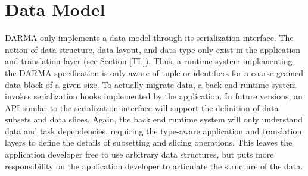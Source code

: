 
\section{Data Model}
\label{sec:data_model}
\gls{DARMA} only implements a \gls{data model} through its \gls{serialization} interface.
The notion of data structure, data layout, and data type only exist in the
application and \gls{translation layer} (see Section \ref{TL}).
Thus, a \gls{runtime system} implementing the \gls{DARMA} specification is only
aware of \gls{tuple} or  identifiers for a coarse-grained data block of a given size.
To actually migrate data, a \gls{back end} \gls{runtime system} invokes
\gls{serialization} hooks implemented by the application.
In future versions, an \gls{API} similar to the \gls{serialization} interface will support the definition of data subsets and data slices.
Again, the \gls{back end} \gls{runtime system} will only understand data and task dependencies,
  requiring the type-aware application and \glspl{translation layer} to define
  the details of subsetting and slicing operations.
This leaves the application developer free to use arbitrary data structures,
     but puts more responsibility on the application developer to articulate
     the structure of the data.


